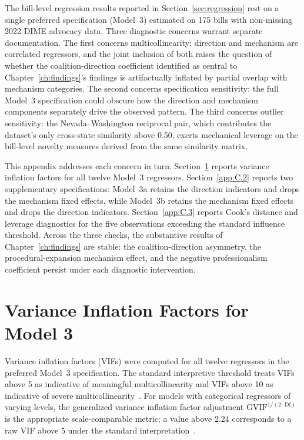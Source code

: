 \documentclass[12pt]{report}
\begin{document}
The bill-level regression results reported in Section~\ref{sec:regression} rest on a single preferred specification (Model~3) estimated on 175 bills with non-missing 2022 DIME advocacy data. Three diagnostic concerns warrant separate documentation. The first concerns multicollinearity: direction and mechanism are correlated regressors, and the joint inclusion of both raises the question of whether the coalition-direction
coefficient identified as central to Chapter~\ref{ch:findings}'s findings is
artifactually inflated by partial overlap with mechanism categories. The second concerns
specification sensitivity: the full Model~3 specification could obscure how the direction
and mechanism components separately drive the observed pattern. The third concerns
outlier sensitivity: the Nevada--Washington reciprocal pair, which contributes the
dataset's only cross-state similarity above 0.50, exerts mechanical leverage on the
bill-level novelty measures derived from the same similarity matrix.

This appendix addresses each concern in turn. Section~\ref{app:C.1} reports variance
inflation factors for all twelve Model~3 regressors. Section~\ref{app:C.2} reports two
supplementary specifications: Model~3a retains the direction indicators and drops the
mechanism fixed effects, while Model~3b retains the mechanism fixed effects and drops
the direction indicators. Section~\ref{app:C.3} reports Cook's distance and leverage
diagnostics for the five observations exceeding the standard influence threshold.
Across the three checks, the substantive results of Chapter~\ref{ch:findings} are
stable: the coalition-direction asymmetry, the procedural-expansion mechanism effect,
and the negative professionalism coefficient persist under each diagnostic intervention.

\section{Variance Inflation Factors for Model 3}
\label{app:C.1}

Variance inflation factors (VIFs) were computed for all twelve regressors in the
preferred Model~3 specification. The standard interpretive threshold treats VIFs above
5 as indicative of meaningful multicollinearity and VIFs above 10 as indicative of
severe multicollinearity~\parencite{neter1996}. For models with categorical regressors
of varying levels, the generalized variance inflation factor adjustment
$\text{GVIF}^{1/(2 \cdot \text{Df})}$ is the appropriate scale-comparable metric; a
value above 2.24 corresponds to a raw VIF above 5 under the standard
interpretation~\parencite{fox2019}.
\end{document}
